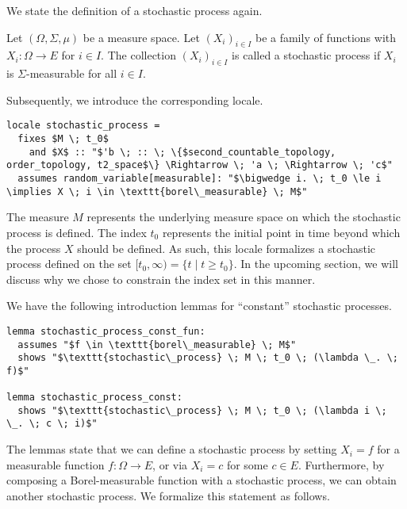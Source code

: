 We state the definition of a stochastic process again.

\begin{definition}
	Let $(\Omega, \Sigma, \mu)$ be a measure space. Let $(X_i)_{i \in I}$ be a family of functions with $X_i : \Omega \rightarrow E$ for $i \in I$. The collection $(X_i)_{i \in I}$ is called a stochastic process if $X_i$ is $\Sigma$-measurable for all $i \in I$.
\end{definition}

Subsequently, we introduce the corresponding locale.

\begin{isadefinition}
{\small
\begin{lstlisting}[style=isabelle]
locale stochastic_process =
  fixes $M \; t_0$ 
    and $X$ :: "$'b \; :: \; \{$second_countable_topology, order_topology, t2_space$\} \Rightarrow \; 'a \; \Rightarrow \; 'c$"
  assumes random_variable[measurable]: "$\bigwedge i. \; t_0 \le i \implies X \; i \in \texttt{borel\_measurable} \; M$"
\end{lstlisting}
}
\end{isadefinition}

The measure $M$ represents the underlying measure space on which the stochastic process is defined. The index $t_0$ represents the initial point in time beyond which the process $X$ should be defined. As such, this locale formalizes a stochastic process defined on the set $[t_0, \infty) = \{t \;\vert\; t \ge t_0\}$. In the upcoming section, we will discuss why we chose to constrain the index set in this manner.

We have the following introduction lemmas for ``constant'' stochastic processes.

\begin{isalemma}
{\small
\begin{lstlisting}[style=isabelle]
lemma stochastic_process_const_fun:
  assumes "$f \in \texttt{borel\_measurable} \; M$"
  shows "$\texttt{stochastic\_process} \; M \; t_0 \; (\lambda \_. \; f)$"

lemma stochastic_process_const:
  shows "$\texttt{stochastic\_process} \; M \; t_0 \; (\lambda i \; \_. \; c \; i)$" 

\end{lstlisting}
}
\end{isalemma}

The lemmas state that we can define a stochastic process by setting $X_i = f$ for a measurable function $f : \Omega \rightarrow E$, or via $X_i = c$ for some $c \in E$. Furthermore, by composing a Borel-measurable function with a stochastic process, we can obtain another stochastic process. We formalize this statement as follows.

